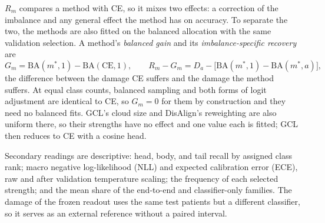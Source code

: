 \documentclass[11pt]{article}
\begin{document}
$R_m$ compares a method with CE, so it mixes two effects: a correction of the imbalance and any general effect the method has on accuracy. To separate the two, the methods are also fitted on the balanced allocation with the same validation selection. A method's \emph{balanced gain} and its \emph{imbalance-specific recovery} are
\begin{equation}
  G_m=\mathrm{BA}(m^{*},1)-\mathrm{BA}(\mathrm{CE},1),\qquad
  R_m-G_m=D_a-\bigl[\mathrm{BA}(m^{*},1)-\mathrm{BA}(m^{*},a)\bigr],
  \label{eq:specific}
\end{equation}
\noindent the difference between the damage CE suffers and the damage the method suffers. At equal class counts, balanced sampling and both forms of logit adjustment are identical to CE, so $G_m=0$ for them by construction and they need no balanced fits. GCL's cloud size and DisAlign's reweighting are also uniform there, so their strengths have no effect and one value each is fitted; GCL then reduces to CE with a cosine head.

Secondary readings are descriptive: head, body, and tail recall by assigned class rank; macro negative log-likelihood (NLL) and expected calibration error (ECE), raw and after validation temperature scaling; the frequency of each selected strength; and the mean share of the end-to-end and classifier-only families. The damage of the frozen readout \citep{queisler2026prevalenceBracs} uses the same test patients but a different classifier, so it serves as an external reference without a paired interval.





\end{document}
